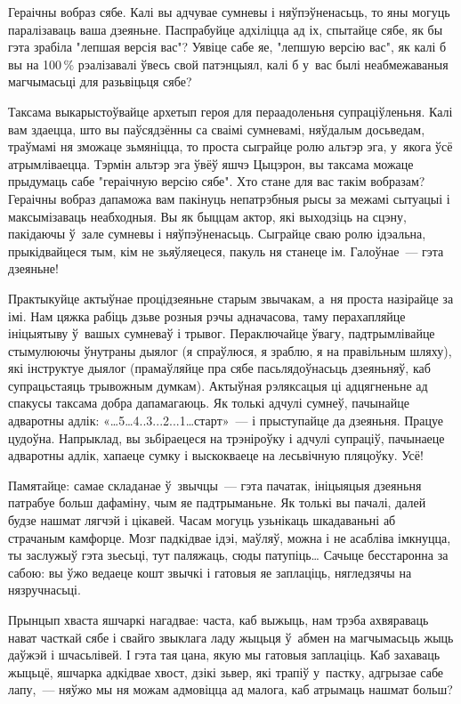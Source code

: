 Гераічны вобраз сябе. Калі вы адчувае сумневы і няўпэўненасьць, то яны могуць паралізаваць ваша дзеяньне. Паспрабуйце адхіліцца ад іх, спытайце сябе, як бы гэта зрабіла "лепшая версія вас"? Уявіце сабе яе, "лепшую версію вас", як калі б вы на 100\,\% рэалізавалі ўвесь свой патэнцыял, калі б у~вас былі неабмежаваныя магчымасьці для разьвіцьця сябе?

Таксама выкарыстоўвайце архетып героя для пераадоленьня супраціўленьня. Калі вам здаецца, што вы паўсядзённы са сваімі сумневамі, няўдалым досьведам, траўмамі ня зможаце зьмяніцца, то проста сыграйце ролю альтэр эга, у~якога ўсё атрымліваецца. Тэрмін альтэр эга ўвёў яшчэ Цыцэрон, вы таксама можаце прыдумаць сабе "гераічную версію сябе". Хто стане для вас такім вобразам? Гераічны вобраз дапаможа вам пакінуць непатрэбныя рысы за межамі сытуацыі і максымізаваць неабходныя. Вы як быццам актор, які выходзіць на сцэну, пакідаючы ў~зале сумневы і няўпэўненасьць. Сыграйце сваю ролю ідэальна, прыкідвайцеся тым, кім не зьяўляецеся, пакуль ня станеце ім. Галоўнае~--- гэта дзеяньне!

Практыкуйце актыўнае процідзеяньне старым звычакам, а~ня проста назірайце за імі. Нам цяжка рабіць дзьве розныя рэчы адначасова, таму перахапляйце ініцыятыву ў~вашых сумневаў і трывог. Пераключайце ўвагу, падтрымлівайце стымулюючы ўнутраны дыялог (я спраўлюся, я зраблю, я на правільным шляху), які інструктуе дыялог (прамаўляйце пра сябе пасьлядоўнасьць дзеяньняў, каб супрацьстаяць трывожным думкам). Актыўная рэляксацыя ці адцягненьне ад спакусы таксама добра дапамагаюць. Як толькі адчулі сумнеў, пачынайце адваротны адлік: «…5…4..3...2...1…старт»~--- і прыступайце да дзеяньня. Працуе цудоўна. Напрыклад, вы зьбіраецеся на трэніроўку і адчулі супраціў, пачынаеце адваротны адлік, хапаеце сумку і выскокваеце на лесьвічную пляцоўку. Усё!

Памятайце: самае складанае ў~звычцы~--- гэта пачатак, ініцыяцыя дзеяньня патрабуе больш дафаміну, чым яе падтрыманьне. Як толькі вы пачалі, далей будзе нашмат лягчэй і цікавей. Часам могуць узьнікаць шкадаваньні аб страчаным камфорце. Мозг падкідвае ідэі, маўляў, можна і не асабліва імкнуцца, ты заслужыў гэта зьесьці, тут паляжаць, сюды патупіць… Сачыце бесстаронна за сабою: вы ўжо ведаеце кошт звычкі і гатовыя яе заплаціць, нягледзячы на нязручнасьці.

Прынцып хваста яшчаркі нагадвае: часта, каб выжыць, нам трэба ахвяраваць нават часткай сябе і свайго звыклага ладу жыцьця ў~абмен на магчымасьць жыць даўжэй і шчасьлівей. І гэта тая цана, якую мы гатовыя заплаціць. Каб захаваць жыцьцё, яшчарка адкідвае хвост, дзікі зьвер, які трапіў у~пастку, адгрызае сабе лапу,~--- няўжо мы ня можам адмовіцца ад малога, каб атрымаць нашмат больш?

